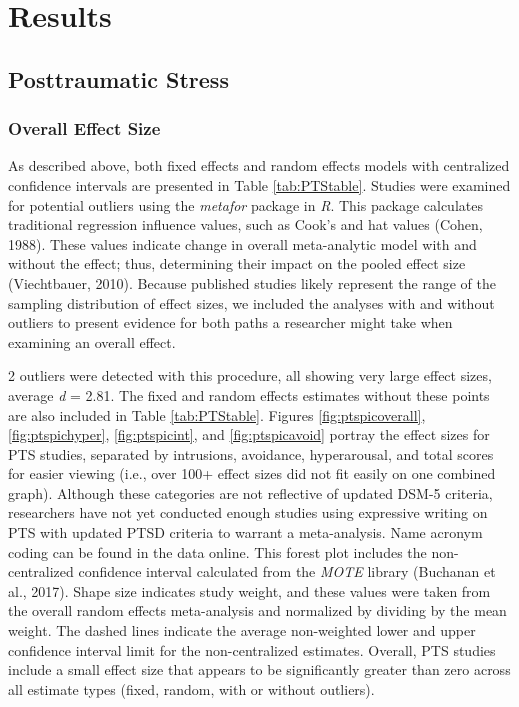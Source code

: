 \documentclass[man, mask]{apa6}
\theoremstyle{definition}
\theoremstyle{definition}
\theoremstyle{definition}
\theoremstyle{remark}
\begin{document}
\section{Results}\label{results}

\subsection{Posttraumatic Stress}\label{posttraumatic-stress-1}

\subsubsection{Overall Effect Size}\label{overall-effect-size}

As described above, both fixed effects and random effects models with
centralized confidence intervals are presented in Table
\ref{tab:PTStable}. Studies were examined for potential outliers using
the \emph{metafor} package in \emph{R}. This package calculates
traditional regression influence values, such as Cook's and hat values
(Cohen, 1988). These values indicate change in overall meta-analytic
model with and without the effect; thus, determining their impact on the
pooled effect size (Viechtbauer, 2010). Because published studies likely
represent the range of the sampling distribution of effect sizes, we
included the analyses with and without outliers to present evidence for
both paths a researcher might take when examining an overall effect.

2 outliers were detected with this procedure, all showing very large
effect sizes, average \emph{d} = 2.81. The fixed and random effects
estimates without these points are also included in Table
\ref{tab:PTStable}. Figures \ref{fig:ptspicoverall},
\ref{fig:ptspichyper}, \ref{fig:ptspicint}, and \ref{fig:ptspicavoid}
portray the effect sizes for PTS studies, separated by intrusions,
avoidance, hyperarousal, and total scores for easier viewing (i.e., over
100+ effect sizes did not fit easily on one combined graph). Although
these categories are not reflective of updated DSM-5 criteria,
researchers have not yet conducted enough studies using expressive
writing on PTS with updated PTSD criteria to warrant a meta-analysis.
Name acronym coding can be found in the data online. This forest plot
includes the non-centralized confidence interval calculated from the
\emph{MOTE} library (Buchanan et al., 2017). Shape size indicates study
weight, and these values were taken from the overall random effects
meta-analysis and normalized by dividing by the mean weight. The dashed
lines indicate the average non-weighted lower and upper confidence
interval limit for the non-centralized estimates. Overall, PTS studies
include a small effect size that appears to be significantly greater
than zero across all estimate types (fixed, random, with or without
outliers).
\end{document}

